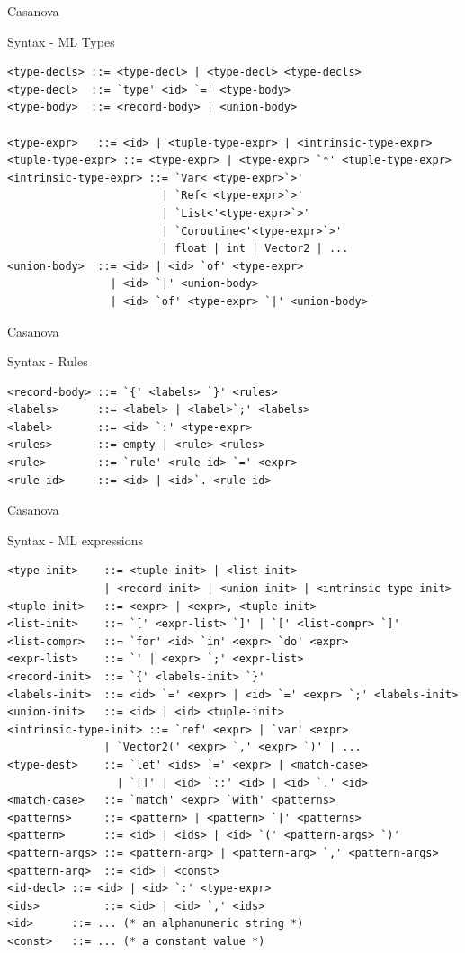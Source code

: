 \documentclass{beamer}
\begin{document}
\begin{frame}[fragile]{Casanova}
\begin{block}{Syntax - ML Types}
\begin{lstlisting}
<type-decls> ::= <type-decl> | <type-decl> <type-decls>
<type-decl>  ::= `type' <id> `=' <type-body>
<type-body>  ::= <record-body> | <union-body>

<type-expr>   ::= <id> | <tuple-type-expr> | <intrinsic-type-expr>
<tuple-type-expr> ::= <type-expr> | <type-expr> `*' <tuple-type-expr>
<intrinsic-type-expr> ::= `Var<'<type-expr>`>' 
                        | `Ref<'<type-expr>`>' 
                        | `List<'<type-expr>`>' 
                        | `Coroutine<'<type-expr>`>' 
                        | float | int | Vector2 | ...
<union-body>  ::= <id> | <id> `of' <type-expr> 
                | <id> `|' <union-body> 
                | <id> `of' <type-expr> `|' <union-body>
\end{lstlisting}
\end{block}
\end{frame}
\begin{frame}[fragile]{Casanova}
\begin{block}{Syntax - Rules}
\begin{lstlisting}
<record-body> ::= `{' <labels> `}' <rules>
<labels>      ::= <label> | <label>`;' <labels>
<label>       ::= <id> `:' <type-expr>
<rules>       ::= empty | <rule> <rules>
<rule>        ::= `rule' <rule-id> `=' <expr>
<rule-id>     ::= <id> | <id>`.'<rule-id>
\end{lstlisting}
\end{block}
\end{frame}
\begin{frame}[fragile]{Casanova}
\begin{block}{Syntax - ML expressions}
\begin{lstlisting}
<type-init>    ::= <tuple-init> | <list-init> 
               | <record-init> | <union-init> | <intrinsic-type-init>
<tuple-init>   ::= <expr> | <expr>, <tuple-init>
<list-init>    ::= `[' <expr-list> `]' | `[' <list-compr> `]'
<list-compr>   ::= `for' <id> `in' <expr> `do' <expr>
<expr-list>    ::= `' | <expr> `;' <expr-list>
<record-init>  ::= `{' <labels-init> `}'
<labels-init>  ::= <id> `=' <expr> | <id> `=' <expr> `;' <labels-init>
<union-init>   ::= <id> | <id> <tuple-init>
<intrinsic-type-init> ::= `ref' <expr> | `var' <expr> 
               | `Vector2(' <expr> `,' <expr> `)' | ...
<type-dest>    ::= `let' <ids> `=' <expr> | <match-case> 
                 | `[]' | <id> `::' <id> | <id> `.' <id>
<match-case>   ::= `match' <expr> `with' <patterns>
<patterns>     ::= <pattern> | <pattern> `|' <patterns>
<pattern>      ::= <id> | <ids> | <id> `(' <pattern-args> `)'
<pattern-args> ::= <pattern-arg> | <pattern-arg> `,' <pattern-args>
<pattern-arg>  ::= <id> | <const>
<id-decl> ::= <id> | <id> `:' <type-expr>
<ids>          ::= <id> | <id> `,' <ids>
<id>      ::= ... (* an alphanumeric string *)
<const>   ::= ... (* a constant value *)
\end{lstlisting}
\end{block}
\end{frame}
\end{document}
